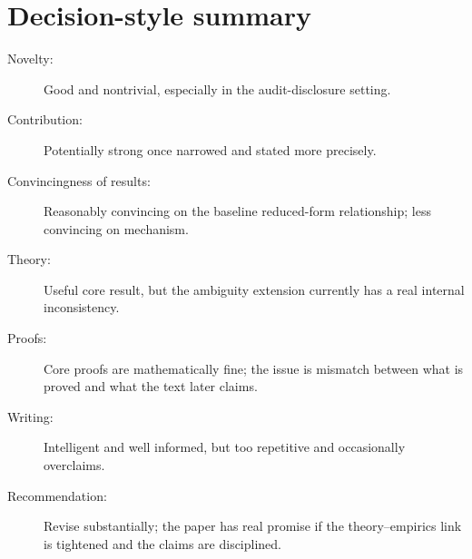 \documentclass[11pt]{article}
\begin{document}
\section*{Decision-style summary}
\begin{description}
    \item[Novelty:] Good and nontrivial, especially in the audit-disclosure setting.
    \item[Contribution:] Potentially strong once narrowed and stated more precisely.
    \item[Convincingness of results:] Reasonably convincing on the baseline reduced-form relationship; less convincing on mechanism.
    \item[Theory:] Useful core result, but the ambiguity extension currently has a real internal inconsistency.
    \item[Proofs:] Core proofs are mathematically fine; the issue is mismatch between what is proved and what the text later claims.
    \item[Writing:] Intelligent and well informed, but too repetitive and occasionally overclaims.
    \item[Recommendation:] Revise substantially; the paper has real promise if the theory--empirics link is tightened and the claims are disciplined.
\end{description}
\end{document}
